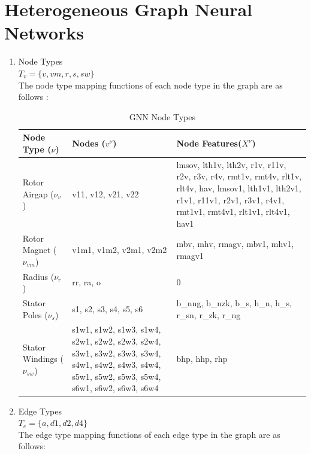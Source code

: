 \documentclass{report} %
\begin{document}
\section{Heterogeneous Graph Neural Networks}
\begin{enumerate}
    \item Node Types \\
    \( T_v = \{ v, vm, r, s, sw\} \) \\
    The node type mapping functions of each node type in the graph are as follows :

    \begin{table}[H]
        \centering
        \begin{tabular}{|p{}|p{}|p{}|}
        \hline 
        {\bf Node Type (\(\nu\))} & {\bf Nodes (\( v^{\nu} \))} & {\bf Node Features(\( X^{\nu}\))}  \\
        \hline
        Rotor Airgap (\( \nu_v \)) & v11, v12, v21, v22 &
        lmsov, lth1v, lth2v, r1v, r11v, r2v, r3v, r4v, rmt1v, rmt4v, rlt1v, rlt4v, hav, \newline
        lmsov1, lth1v1, lth2v1, r1v1, r11v1, r2v1, r3v1, r4v1, rmt1v1, rmt4v1, rlt1v1, rlt4v1, hav1 \\
        \hline
        Rotor Magnet (\( \nu_{vm} \)) & 
        v1m1, v1m2, v2m1, v2m2 & 
        mbv, mhv, rmagv, mbv1, mhv1, rmagv1 \\
        \hline
        Radius (\( \nu_r \)) & 
        rr, ra, o & 0 \\
        \hline
        Stator Poles (\( \nu_s \)) & 
        s1, s2, s3, s4, s5, s6 & 
        b\_nng, b\_nzk, b\_s, h\_n, h\_s, r\_sn, r\_zk, r\_ng \\
        \hline
        Stator Windings (\( \nu_{sw} \)) & 
        s1w1, s1w2, s1w3, s1w4, \newline
        s2w1, s2w2, s2w3, s2w4, \newline
        s3w1, s3w2, s3w3, s3w4, \newline
        s4w1, s4w2, s4w3, s4w4, \newline
        s5w1, s5w2, s5w3, s5w4, \newline
        s6w1, s6w2, s6w3, s6w4 & 
        bhp, hhp, rhp \\
        \hline
        \end{tabular}
        \caption{\ac{GNN} Node Types}
        \label{tab:GNN Node Types}
    \end{table}

    \item Edge Types \\
    \( T_e = \{ a, d1, d2, d4\} \)\\
    The edge type mapping functions of each edge type in the graph are as follows: \\


\end{enumerate}
\end{document}
